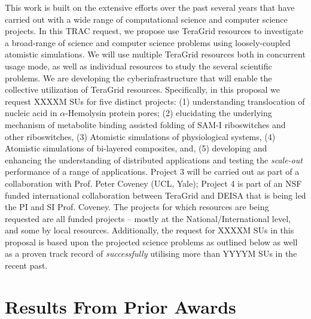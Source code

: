 \documentclass[a4paper,10pt]{article}
\begin{document}
This work is built on the extensive efforts over the past several years that have carried out with a wide range of computational science and computer science projects. In this TRAC request, we propose use TeraGrid resources to investigate a broad-range of science and computer science problems using loosely-coupled atomistic simulations.  We will use multiple TeraGrid resources both in concurrent usage mode, as well as individual resources to study the several scientific problems. We are developing the cyberinfrastructure that will enable the collective utilization of TeraGrid resources.  Specifically, in this proposal we request XXXXM SUs for five distinct projects: (1) understanding translocation of nucleic acid in $\alpha$-Hemolysin protein pores; (2) elucidating the underlying mechanism of metabolite binding assisted folding of SAM-I riboswitches and other riboswitches, (3) Atomistic simulations of physiological systems, (4) Atomistic simulations of bi-layered composites, and, (5) developing and enhancing the understanding of distributed applications and testing the {\it scale-out } performance of a range of applications.  Project 3 will be carried out as part of a collaboration with Prof. Peter Coveney (UCL, Yale); Project 4 is part of an NSF funded international collaboration between TeraGrid and DEISA that is being led the PI and SI Prof. Coveney.  The projects for which resources are being requested are all funded projects -- mostly at the National/International level, and some by local resources.  Additionally, the request for XXXXM SUs in this proposal is based upon the projected science problems as outlined below as well as a proven track record of {\it successfully} utilising more than YYYYM SUs in the recent past.

\section{Results From Prior Awards}





\end{document}
